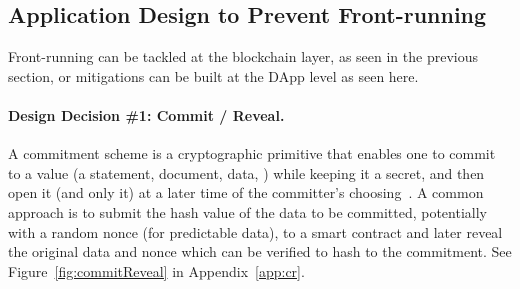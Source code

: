 

\subsection{Application Design to Prevent Front-running}

Front-running can be tackled at the blockchain layer, as seen in the previous section, or mitigations can be built at the DApp level as seen here. 

\paragraph{Design Decision \#1: Commit / Reveal.} \label{CommitmentScheme}
A commitment scheme is a cryptographic primitive that enables one to commit to a value (\eg a statement, document, data, \etc) while keeping it a secret, and then open it (and only it) at a later time of the committer's choosing~\cite{brassard1988minimum}. A common approach is to submit the hash value of the data to be committed, potentially with a random nonce (for predictable data), to a smart contract and later reveal the original data and nonce which can be verified to hash to the commitment. See Figure~\ref{fig:commitReveal} in Appendix~\ref{app:cr}. 

